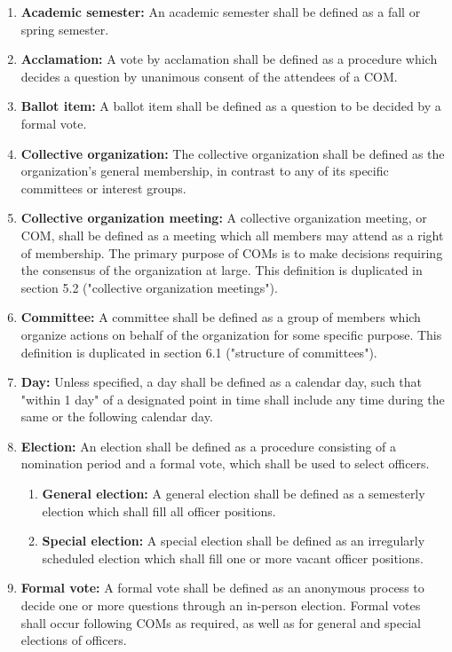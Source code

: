\documentclass[11pt]{article}
\newcounter{h1}
\newcounter{h2}[h1]
\newcounter{h3}[h2]
\begin{document}

\begin{enumerate}
  \item \textbf{Academic semester:} An academic semester shall be defined as a fall or spring semester.  
  \item \textbf{Acclamation:} A vote by acclamation shall be defined as a procedure which decides a question by unanimous consent of the attendees of a COM.  
  \item \textbf{Ballot item:} A ballot item shall be defined as a question to be decided by a formal vote.  
  \item \textbf{Collective organization:} The collective organization shall be defined as the organization's general membership, in contrast to any of its specific committees or interest groups.  
  \item \textbf{Collective organization meeting:} A collective organization meeting, or COM, shall be defined as a meeting which all members may attend as a right of membership. The primary purpose of COMs is to make decisions requiring the consensus of the organization at large. This definition is duplicated in section 5.2 ("collective organization meetings").  
  \item \textbf{Committee:} A committee shall be defined as a group of members which organize actions on behalf of the organization for some specific purpose. This definition is duplicated in section 6.1 ("structure of committees").  
  \item \textbf{Day:} Unless specified, a day shall be defined as a calendar day, such that "within 1 day" of a designated point in time shall include any time during the same or the following calendar day.  
  \item \textbf{Election:} An election shall be defined as a procedure consisting of a nomination period and a formal vote, which shall be used to select officers.  
  \begin{enumerate}
    \item \textbf{General election:} A general election shall be defined as a semesterly election which shall fill all officer positions.  
    \item \textbf{Special election:} A special election shall be defined as an irregularly scheduled election which shall fill one or more vacant officer positions.  
  \end{enumerate}
  \item \textbf{Formal vote:} A formal vote shall be defined as an anonymous process to decide one or more questions through an in-person election. Formal votes shall occur following COMs as required, as well as for general and special elections of officers.  

\end{enumerate}
\end{document}
